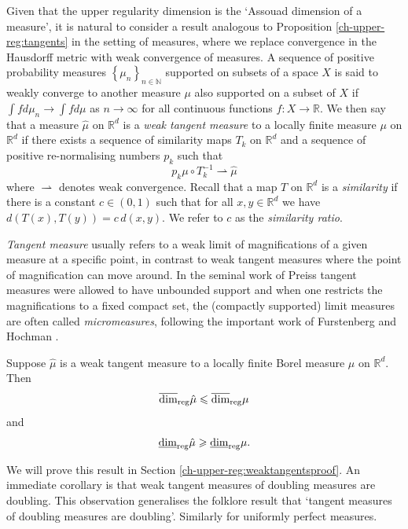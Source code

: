 Given that the upper regularity dimension is the `Assouad dimension of a measure', it is natural to consider a result analogous to Proposition \ref{ch-upper-reg:tangents} in the setting of measures, where we replace convergence in the Hausdorff metric with weak convergence of measures. A sequence of positive probability measures $\left\{\mu_n\right\}_{n\in \mathbb{N}}$ supported on subsets of a space $X$ is said to weakly converge to another measure $\mu$ also supported on a subset of $X$ if $\int fd \mu_n \rightarrow \int fd \mu$ as $n\rightarrow \infty$ for all continuous functions $f\colon X \rightarrow \mathbb{R}$. We then say that a measure  $\hat{\mu}$ on $ \mathbb{R}^d$ is a \emph{weak tangent measure} to a locally finite measure $\mu$ on $\mathbb{R}^d$ if there exists a sequence of similarity maps $T_k$ on  $\mathbb{R}^d$ and a sequence of positive re-normalising numbers $p_k$ such that
\[
p_k \mu \circ T^{-1}_k  \rightharpoonup \hat{\mu}
\]
where $\rightharpoonup$ denotes weak convergence. Recall that a map $T$ on $\mathbb{R}^d$ is a \emph{similarity} if there is a constant $c  \in \left(0,1 \right)$ such that  for all $x,y \in \mathbb{R}^d$ we have $d(T(x) , T(y) ) = c \, d(x, y )$.  We refer to $c$ as the \emph{similarity ratio}. 

\emph{Tangent measure} usually refers to a weak limit of magnifications of a given measure at a specific point, in contrast to weak tangent measures where the point of magnification can move around. In the seminal work of Preiss \cite{preiss} tangent measures were allowed to have unbounded support and when one restricts the magnifications to a fixed compact set, the (compactly supported) limit measures are often called \emph{micromeasures}, following the important work of Furstenberg \cite{furstenberg} and Hochman \cite{hochman}.  


\begin{theorem}\label{ch-upper-reg:weaktangents}
	Suppose $\hat{\mu}$ is a weak tangent measure to a locally finite Borel measure  $\mu$ on $\mathbb{R}^d$.  Then 
	\[\overline{\dim}_{\textup{reg}} \hat{\mu} \leqslant \overline{\dim}_{\textup{reg}} \mu \]
	and
	\[\underline{\dim}_{\textup{reg}} \hat{\mu} \geqslant \underline{\dim}_{\textup{reg}} \mu.	\]
\end{theorem}

We will prove this result in Section \ref{ch-upper-reg:weaktangentsproof}.  An immediate corollary  is that weak tangent measures of doubling measures are doubling.  This observation generalises the folklore result that `tangent measures of doubling measures are doubling'. Similarly for uniformly perfect measures. 

